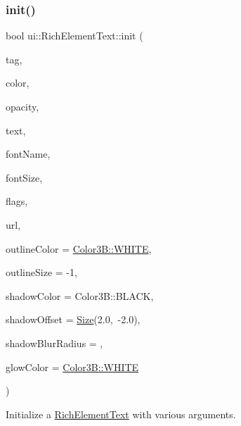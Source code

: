 \subsubsection{\texorpdfstring{init()}{init()}\hspace{0.1cm}{\footnotesize\ttfamily [2/2]}}
{\footnotesize\ttfamily bool ui\+::\+Rich\+Element\+Text\+::init (\begin{DoxyParamCaption}\item[{int}]{tag,  }\item[{const \hyperlink{structColor3B}{Color3B} \&}]{color,  }\item[{G\+Lubyte}]{opacity,  }\item[{const std\+::string \&}]{text,  }\item[{const std\+::string \&}]{font\+Name,  }\item[{float}]{font\+Size,  }\item[{uint32\+\_\+t}]{flags,  }\item[{const std\+::string \&}]{url,  }\item[{const \hyperlink{structColor3B}{Color3B} \&}]{outline\+Color = {\ttfamily \hyperlink{structColor3B_adf57cb86ca15f434b29215ad471cdc35}{Color3\+B\+::\+W\+H\+I\+TE}},  }\item[{int}]{outline\+Size = {\ttfamily -\/1},  }\item[{const \hyperlink{structColor3B}{Color3B} \&}]{shadow\+Color = {\ttfamily Color3B\+:\+:BLACK},  }\item[{const cocos2d\+::\+Size \&}]{shadow\+Offset = {\ttfamily \hyperlink{classSize}{Size}(2.0,~-\/2.0)},  }\item[{int}]{shadow\+Blur\+Radius = {},  }\item[{const \hyperlink{structColor3B}{Color3B} \&}]{glow\+Color = {\ttfamily \hyperlink{structColor3B_adf57cb86ca15f434b29215ad471cdc35}{Color3\+B\+::\+W\+H\+I\+TE}} }\end{DoxyParamCaption})}



Initialize a \hyperlink{classui_1_1RichElementText}{Rich\+Element\+Text} with various arguments. 


